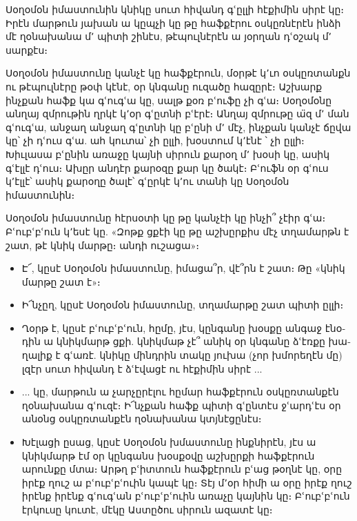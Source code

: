 \sloppy
\begin{otherlanguage}{armenian}
Սօղօմօն իմաստունին կնիկը սուտ հիվանդ գՙըլլի հէքիմին սիրէ կը։ Իրէն մարթուն յախան ա կըպչի կը թը հաֆքէրու օսկըռնէրէն ինձի մէ ղօնախանա մ՚ պիտի շինէս, թէպուլնէրէն ա յօրղան դՙօշակ մ՚ սարքէս։

Սօղօմօն իմաստունը կանչէ կը հաֆքէրուն, մօրթէ կ՚ւո օսկըռտանքն ու թէպուլնէրը թօփ կէնէ, օր կնգանը ուզածը հազըրէ։ Աշխարք ինչքան հաֆք կա գՙուգՙա կը, սալթ քօռ բՙուֆը չի գՙա։ Սօղօմօնը անղայ զմրութին ղրկէ կ՚օր գՙըտնի բՙէրէ։ Անղայ զմրութը ա̈զ մ՚ ման գՙուգՙա, անջաղ անջաղ գՙըտնի կը բՙընի մ՚ մէչ, ինչքան կանչէ ճըվա կը՝ չի դՙուս գՙա. ահ կուտա՝ չի ըլլի, խօստում կ՚էնէ ՝ չի ըլլի։ Խիւլասա բՙընին առաջը կայնի սիրուն քարօղ մ՚ խօսի կը, ասիկ գՙէլլէ դՙուս։ Ախըր անդէր քարօզը քար կը ծակէ։ Բՙուֆն օր գՙուս կ՚էլլէ՝ ասիկ քարօղը ծալէ՝ գՙըրկէ կ՚ու տանի կը Սօղօմօն իմաստունին։

Սօղօմօն իմաստունը հէրսօտի կը թը կանչէի կը ինչի՞ չէիր գՙա։ Բՙուբՙբՙուն կ՚եսէ կը. «Զոթք ցքէի կը թը աշխըրքիս մէչ տղամարթն է շատ, թէ կնիկ մարթը։ անդի ուշացա»։

\begin{itemize}
\item Է՜, կըսէ Սօղօմօն իմաստունը, իմացա՞ր, վէ՞րն է շատ։ Թը «կնիկ մարթը շատ է»։
\item Ի՜նչըղ, կըսէ Սօղօմօն իմաստունը, տղամարթը շատ պիտի ըլլի։
\item Ղօրթ է, կըսէ բՙուբՙբՙուն, հըմը, յէս, կընգանը խօսքը անգաջ էնօդին ա կնիկմարթ ցքի. կնիկմաթ չէ՞ անիկ օր կնգանը ձՙէռքը խաղալիք է գՙառէ. կնիկը մինդրին տակը յուխա (չոր խմորեղէն մը) լզէր սուտ հիվանդ է ձՙէվացէ ու հէքիմին սիրէ ... 
\end{itemize}
\end{otherlanguage}
\begin{adjarianpage}\label{page:114}\end{adjarianpage}%
\begin{otherlanguage}{armenian}
\begin{itemize}
\item[]  ... կը, մարթուն ա չարչըրէլու հըմար հաֆքէրուն օսկըռտանքէն ղօնախանա գՙուզէ։ Ի՜նչքան հաֆք պիտի գՙընտէս ջՙարդՙէս օր անօնց օսկըռտանքէն ղօնախանա կտյնէցընէս։

\item Խէլացի ըսաց, կըսէ Սօղօմօն խմաստունը ինքնիրէն, յէս ա կնիկմարթ էմ օր կընգանս խօսքօվը աշխըրքի հաֆքէրուն արունքը մտա։ Արթղ բՙիտտուն հաֆքէրուն բՙաց թօղնէ կը, օրը իրէք ղուշ ա բՙուբՙբՙուին կապէ կը։ Տէյ մ՚օր հիմի ա օրը իրէք ղուշ իրէնք իրէնք գՙուգՙան բՙուբՙբՙուին առաչը կայնին կը։ Բՙուբՙբՙուն էրկուսը կուտէ, մէկը Աստըծու սիրուն ազատէ կը։
\end{itemize}
\end{otherlanguage}

